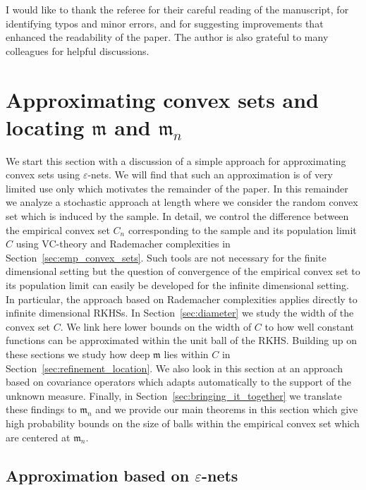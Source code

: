 \documentclass[AHL,Unicode,longabstracts,published]{cedram}
\theoremstyle{remark}
\newcommand{\mean}{\mathfrak{m}}
\begin{document}
I would like to thank the referee for their careful reading of the manuscript, for identifying typos and minor errors, and for suggesting improvements that enhanced the readability of the paper. The author is also grateful to many colleagues for helpful discussions.


\section{Approximating convex sets and locating \texorpdfstring{$\mean$}{mean} and \texorpdfstring{$\mean_n$}{mean\_n}} 

We start this section with a discussion of a simple approach for approximating convex sets using $\varepsilon$-nets. We will find that such an approximation is of very limited use only which motivates the remainder of the paper. In this remainder we analyze a stochastic approach at length where we consider the random convex set which is induced by the sample. In detail, we control the difference between the empirical convex set $C_n$ corresponding to the sample and its population limit $C$ using VC-theory and Rademacher complexities in Section~\ref{sec:emp_convex_sets}. Such tools are not necessary for the finite dimensional setting but the question of convergence of the empirical convex set to its population limit can easily be developed for the infinite dimensional setting. In particular, the approach based on Rademacher complexities applies directly to infinite dimensional RKHSs. In Section~\ref{sec:diameter} we study the width of the convex set $C$. We link here lower bounds on the width of $C$ to how well constant functions can be approximated within the unit ball of the RKHS. Building up on these sections we study how deep $\mean$ lies within $C$ in Section~\ref{sec:refinement_location}. We also look in this section at an approach based on covariance operators which adapts automatically to the support of the unknown measure. Finally, in Section~\ref{sec:bringing_it_together} we translate these findings to $\mean_n$ and we provide our main theorems in this section which give high probability bounds on the size of balls within the empirical convex set which are centered at $\mean_n$.

\subsection{Approximation based on \texorpdfstring{$\varepsilon$}{varepsilon}-nets}
\label{ref:approxEpsNet}
\end{document}
